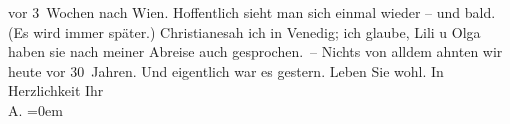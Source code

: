 \begin{ledgroupsized}[t]{13cm}
               vor 3 Wochen nach Wien. Hoffentlich sieht man {\pb}sich einmal wieder – und bald. (Es wird immer später.)
                  Christianesah ich in Venedig; ich glaube, Lili u Olga haben sie nach meiner Abreise auch
               gesprochen. –\pend
           \pstart
           Nichts von alldem ahnten wir heute vor 30 Jahren. Und eigentlich war es gestern.\pend
           \pstart
           Leben Sie wohl.\pend
           \pstart
           In Herzlichkeit Ihr{\\[\baselineskip]}\spacefill\mbox{A.}\pend
           \leftskip=0em{}
         
         \endnumbering{}\end{ledgroupsized}  \newcommand{\dateiname}{L02453}\newcommand{\titel}{Arthur Schnitzler an Hugo Hofmannsthal, 9. 10. 1925}\newcommand{\editorInnen}{Martin Anton Müller und Gerd-Hermann Susen}
      